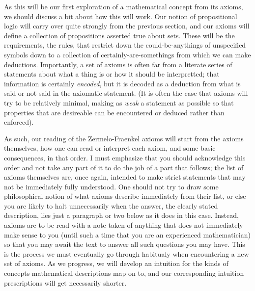 \documentclass[11pt]{article}
\begin{document}
As this will be our first exploration of a mathematical concept from its axioms, we should discuss a bit about how this will work. Our notion of propositional logic will carry over quite strongly from the previous section, and our axioms will define a collection of propositions asserted true about sets. These will be the requirements, the rules, that restrict down the could-be-anythings of unspecified symbols down to a collection of certainly-are-somethings from which we can make deductions. Importantly, a set of axioms is often far from a literate series of statements about what a thing is or how it should be interpretted; that information is certainly \emph{encoded}, but it is decoded as a deduction from what is said or not said in the axiomatic statement. (It is often the case that axioms will try to be relatively minimal, making as \emph{weak} a statement as possible so that properties that are desireable can be encountered or deduced rather than enforced).

As such, our reading of the Zermelo-Fraenkel axioms will start from the axioms themselves, how one can read or interpret each axiom, and some basic consequences, in that order. I must emphasize that you should acknowledge this order and not take any part of it to do the job of a part that follows; the list of axioms themselves are, once again, intended to make strict statements that may not be immediately fully understood. One should not try to draw some philosophical notion of what axioms describe immediately from their list, or else you are likely to halt unnecessarily when the answer, the clearly stated description, lies just a paragraph or two below as it does in this case. Instead, axioms are to be read with a note taken of anything that does not immediately make sense to you (until such a time that you are an experienced mathematician) so that you may await the text to answer all such questions you may have. This is the process we must eventually go through habitualy when encountering a new set of axioms. As we progress, we will develop an intuition for the kinds of concepts mathematical descriptions map on to, and our corresponding intuition prescriptions will get necessarily shorter.
\end{document}
